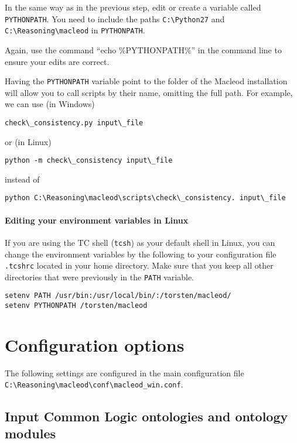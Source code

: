 \documentclass{article}
\begin{document}
In the same way as in the previous step, edit or create a variable called \texttt{PYTHONPATH}. You need to include the paths \texttt{C:\textbackslash Python27} and \texttt{C:\textbackslash Reasoning\textbackslash macleod} in \texttt{PYTHONPATH}.

Again, use the command ``echo \%PYTHONPATH\%'' in the command line to ensure your edits are correct.

Having the \texttt{PYTHONPATH} variable point to the folder of the Macleod installation will allow you to call scripts by their name, omitting the full path. For example, we can use (in Windows)
\begin{verbatim}
check\_consistency.py input\_file
\end{verbatim}
or (in Linux)
\begin{verbatim}
python -m check\_consistency input\_file
\end{verbatim}
instead of
\begin{verbatim}
python C:\Reasoning\macleod\scripts\check\_consistency. input\_file
\end{verbatim}

\paragraph{Editing your environment variables in Linux}
If you are using the TC shell (\texttt{tcsh}) as your default shell in Linux, you can change the environment variables by the following to your configuration file \texttt{.tcshrc} located in your home directory.  Make sure that you keep all other directories that were previously in the \texttt{PATH} variable.
\begin{verbatim}
setenv PATH /usr/bin:/usr/local/bin/:/torsten/macleod/
setenv PYTHONPATH /torsten/macleod
\end{verbatim}


\section{Configuration options}

The following settings are configured in the main configuration file \texttt{C:\textbackslash Reasoning\textbackslash macleod\textbackslash conf\textbackslash macleod\_win.conf}.

\subsection{Input Common Logic ontologies and ontology modules}
\end{document}
